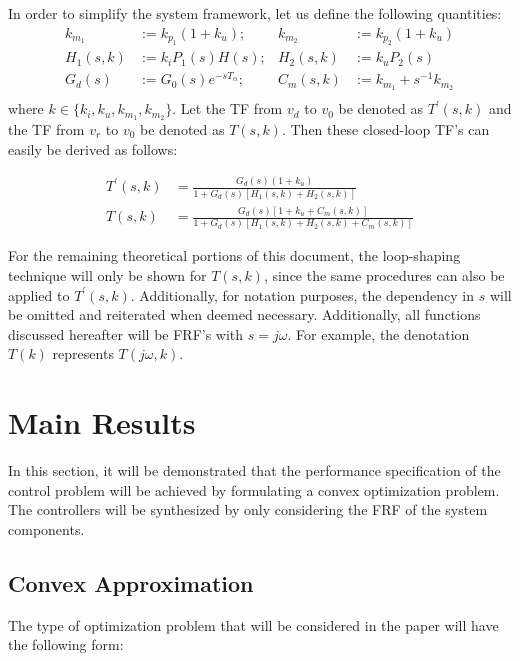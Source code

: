 \documentclass[a4paper, 10pt, conference]{ieeeconf}
\begin{document}
In order to simplify the system framework, let us define the following quantities:
\begin{equation} \label{eq:new_var}
\begin{aligned}
k_{m_1} &:= k_{p_1}(1+k_u) ;  &k_{m_2} &:= k_{p_2}(1+k_u)  \\
H_1(s,k) &:= k_iP_1(s)H(s);  &H_2(s,k) &:= k_uP_2(s) \\
G_d(s) &:= G_0(s)e^{-sT_\alpha}; &C_m(s,k) &:= k_{m_1}+s^{-1}k_{m_2}\\ 
\end{aligned}
\end{equation}
where $k \in \{k_i,k_u,k_{m_1},k_{m_2}\}$. Let the TF from $v_d$ to $v_0$ be denoted as $T^{\prime}(s,k)$ and the TF from $v_r$ to $v_0$ be denoted as $T(s,k)$.  Then these closed-loop TF's can easily be derived as follows:

\begin{align}
T^{\prime}(s,k) &= \frac{G_d(s)(1+k_u)}{1+G_d(s)[H_1(s,k)+H_2(s,k)]} \label{eq:Tclp}  \\ 
T(s,k) &= \frac{G_d(s)[1+k_u+C_m(s,k)]}{1+G_d(s)[H_1(s,k)+H_2(s,k)+C_m(s,k)]}  \label{eq:Tcl} 
\end{align}

For the remaining theoretical portions of this document, the loop-shaping technique will only be shown for $T(s,k)$, since the same procedures can also be applied to $T^{\prime}(s,k)$. Additionally, for notation purposes, the dependency in $s$ will be omitted and reiterated when deemed necessary. Additionally, all functions discussed hereafter will be FRF's with $s = j\omega$. For example, the denotation $T(k)$ represents $T(j\omega,k)$.



\section{Main Results}
\label{sec:main}
In this section, it will be demonstrated that the performance specification of the control problem will be achieved by formulating a convex optimization problem. The controllers will be synthesized by only considering the FRF of the system components.

\subsection{Convex Approximation}
The type of optimization problem that will be considered in the paper will have the following form:
\end{document}
